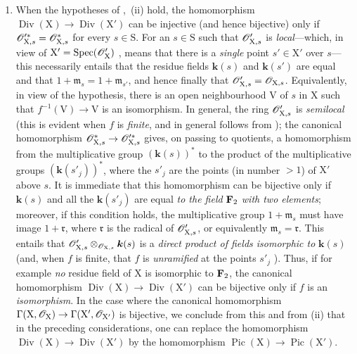 \begin{remarks}[21.8.6]
\begin{enumerate}[label=(\roman*)]
  \item When the hypotheses of ,{}~(ii) hold, the homomorphism $\operatorname{Div}(\mathrm{X})\to\operatorname{Div}(\mathrm{X}')$ can be injective (and hence bijective) only if $\mathscr{O}'^{*}_{\mathrm{X},s}=\mathscr{O}^*_{\mathrm{X},s}$ for every $s\in\mathrm{S}$.
For an $s\in\mathrm{S}$ such that $\mathscr{O}'_{\mathrm{X},s}$ is \emph{local}---which, in view of $\mathrm{X}'=\operatorname{Spec}(\mathscr{O}'_\mathrm{X})$ , means that there is a \emph{single} point $s'\in\mathrm{X}'$ over $s$---this necessarily entails that the residue fields $\boldsymbol{k}(s)$ and $\boldsymbol{k}(s')$ are equal and that $1+\mathfrak{m}_s=1+\mathfrak{m}_{s'}$, and hence finally that $\mathscr{O}'_{\mathrm{X},s}=\mathscr{O}_{\mathrm{X},s}$.
Equivalently, in view of the hypothesis, there is an open neighbourhood $\mathrm{V}$ of $s$ in $\mathrm{X}$ such that $f^{-1}(\mathrm{V})\to\mathrm{V}$ is an isomorphism.
In general, the ring $\mathscr{O}'_{\mathrm{X},s}$ is \emph{semilocal} (this is evident when $f$ is \emph{finite}, and in general follows from ); the canonical homomorphism $\mathscr{O}^{*}_{\mathrm{X},s}\to\mathscr{O}'^{*}_{\mathrm{X},s}$ gives, on passing to quotients, a homomorphism from the multiplicative group $(\boldsymbol{k}(s))^*$ to the product of the multiplicative groups $(\boldsymbol{k}(s'_j))^*$, where the $s'_j$ are the points (in
  number $>1$) of $\mathrm{X}'$ above $s$.
It is immediate that this homomorphism can be bijective only if $\boldsymbol{k}(s)$ and all the $\boldsymbol{k}(s'_j)$ are equal \emph{to the field} $\mathbf{F}_2$ \emph{with two elements};
moreover, if this condition holds, the multiplicative group $1+\mathfrak{m}_s$ must have image $1+\mathfrak{r}$, where $\mathfrak{r}$ is the radical of $\mathscr{O}'_{\mathrm{X},s}$, or equivalently $\mathfrak{m}_s=\mathfrak{r}$.
This entails that $\mathscr{O}'_{\mathrm{X},s}\otimes_{\mathscr{O}_{\mathrm{X},s}}\boldsymbol{k}(s)$ is a \emph{direct product of fields isomorphic to} $\boldsymbol{k}(s)$ (and, when $f$ is finite, that $f$ is \emph{unramified} at the points $s'_j$ ).
Thus, if for example \emph{no} residue field of $\mathrm{X}$ is isomorphic to $\mathbf{F}_2$, the canonical homomorphism $\operatorname{Div}(\mathrm{X})\to\operatorname{Div}(\mathrm{X}')$ can be bijective only if $f$ is an \emph{isomorphism}.
In the case where the canonical homomorphism $\Gamma(\mathrm{X},\mathscr{O}_\mathrm{X})\to\Gamma(\mathrm{X}',\mathscr{O}_{\mathrm{X}'})$ is bijective, we conclude from this and from (ii) that in the preceding considerations, one can replace the homomorphism $\operatorname{Div}(\mathrm{X})\to\operatorname{Div}(\mathrm{X}')$ by the homomorphism $\operatorname{Pic}(\mathrm{X})\to\operatorname{Pic}(\mathrm{X}')$.
\end{enumerate}
\end{remarks}



